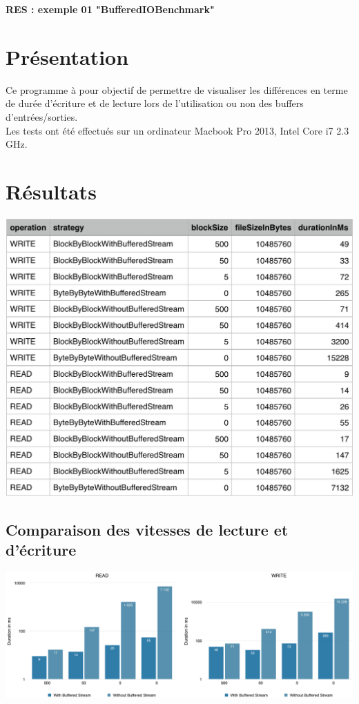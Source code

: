\documentclass[french]{article}
\begin{document}
	\centering
	\large{\textbf{RES : exemple 01 "BufferedIOBenchmark"}}
	
	\justify
	
	\section{Présentation}
		\noindent Ce programme à pour objectif de permettre de visualiser les différences en terme de durée d'écriture et de lecture lors de l'utilisation ou non des buffers d'entrées/sorties. \\
		
		\noindent Les tests ont été effectués sur un ordinateur Macbook Pro 2013, Intel Core i7 2.3 GHz. \\
		
	\section{Résultats}
		\centering
		\includegraphics[width=400pt]{images/results.png}
		
		\pagebreak
				
		\justify
		
		\subsection{Comparaison des vitesses de lecture et d'écriture}
			\noindent \includegraphics[width=480pt]{images/graphiques.jpg} \\
			
\end{document}

